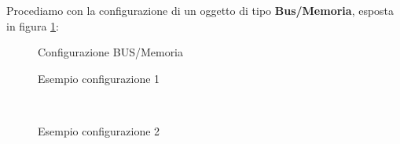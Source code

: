 Procediamo con la configurazione di un oggetto di tipo \textbf{Bus/Memoria}, esposta in figura \ref{img:cfg_MEM}:

\begin{figure}[htbp]
    \centering
    \caption{Configurazione BUS/Memoria}
    \label{img:cfg_MEM}
\end{figure}


\begin{figure}[htbp]
    \centering
    \caption{Esempio configurazione 1}
\end{figure}

\begin{figure}[htbp]
    \centering
    \\[0.5cm]

    \caption{Esempio configurazione 2}
\end{figure}
